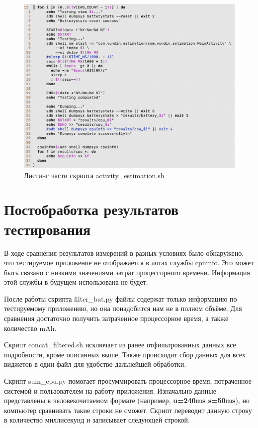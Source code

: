 \documentclass[a4paper,14pt]{extarticle} %
\begin{document}
	\begin{figure}[tbh]
		\includegraphics[width=\textwidth]{activity_estimation}
		\caption{Листинг части скрипта activity\_estimation.sh}
		\label{fig:activity_estimation}
	\end{figure}

	\section{Постобработка результатов тестирования}
	
	В ходе сравнения результатов измерений в разных условиях было обнаружено, что тестируемое приложение не отображается в логах службы cpuinfo. Это может быть связано с низкими значениями затрат процессорного времени. Информация этой службы в будущем использована не будет.
	
	После работы скрипта filter\_bat.py файлы содержат только информацию по тестируемому приложению, но она понадобится нам не в полном объёме. Для сравнения достаточно получить затраченное процессорное время, а также количество mAh.
	
	Скрипт concat\_filtered.sh исключает из ранее отфильтрованных данных все подробности, кроме описанных выше. Также происходит сбор данных для всех виджетов в один файл для удобство дальнейшей обработки.
	
	Скрипт sum\_cpu.py помогает просуммировать процессорное время, потраченное системой и пользователем на работу приложения. Изначально данные представлены в человекочитаемом формате (например, \textbf{u=240ms s=50ms}), но компьютер сравнивать такие строки не сможет. Скрипт переводит данную строку в количество миллисекунд и записывает следующей строкой.
\end{document}
